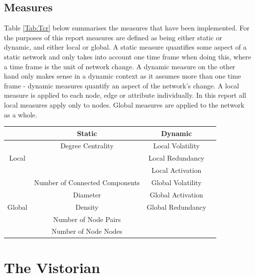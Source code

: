 \subsection{Measures}
Table \ref{Tab:Tcr} below summarises the measures that have been implemented. For the purposes of this report measures are defined as being either static or dynamic, and either local or global. A static measure quantifies some aspect of a static network and only takes into account one time frame when doing this, where a time frame is the unit of network change. A dynamic measure on the other hand only makes sense in a dynamic context as it assumes more than one time frame - dynamic measures quantify an aspect of the network's change. A local measure is applied to each node, edge or attribute individually. In this report all local measures apply only to nodes. Global measures are applied to the network as a whole.

\begin{center}
\begin{table}
\begin{tabular}{ |c|c|c|c| } 
\hline
 & Static & Dynamic \\
\hline
\multirow{3}{4em}{Local} & Degree Centrality & Local Volatility \\ 
& & Local Redundancy \\ 
& & Local Activation \\ 
\hline
\multirow{5}{4em}{Global} & Number of Connected Components & Global Volatility \\
 & Diameter & Global Activation \\
 & Density & Global Redundancy  \\
 & Number of Node Pairs &   \\
 & Number of Node Nodes &   \\
\hline
\end{tabular}
\end{table}
\end{center}


\section{The Vistorian}

